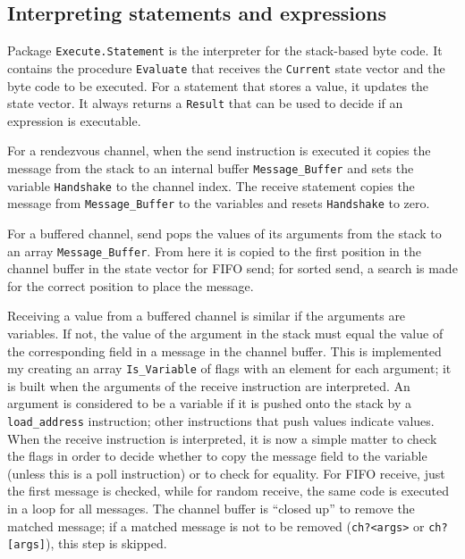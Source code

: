 \documentclass[11pt]{article}
\newcommand*{\p}[1]{\texttt{#1}}
\begin{document}
\subsection{Interpreting statements and expressions}
Package \p{Execute.Statement} is the interpreter for the stack-based
byte code. It contains the procedure \p{Evaluate} that receives the
\p{Current} state vector and the byte code to be executed. For a
statement that stores a value, it updates the state vector. It always
returns a \p{Result} that can be used to decide if an expression is
executable.

For a rendezvous channel, when the send instruction is executed it
copies the message from the stack to an internal buffer
\p{Message\_Buffer} and sets the variable \p{Handshake} to the channel
index. The receive statement copies the message from \p{Message\_Buffer}
to the variables and resets \p{Handshake} to zero.

For a buffered channel, send pops the values of its arguments from the
stack to an array \p{Message\_Buffer}. From here it is copied to the
first position in the channel buffer in the state vector for FIFO send;
for sorted send, a search is made for the correct position to place the
message.

Receiving a value from a buffered channel is similar if the arguments
are variables. If not, the value of the argument in the stack must equal
the value of the corresponding field in a message in the channel buffer.
This is implemented my creating an array \p{Is\_Variable} of flags with
an element for each argument; it is built when the arguments of the
receive instruction are interpreted. An argument is considered to be a
variable if it is pushed onto the stack by a \p{load\_address}
instruction; other instructions that push values indicate values. When
the receive instruction is interpreted, it is now a simple matter to
check the flags in order to decide whether to copy the message field to
the variable (unless this is a poll instruction) or to check for
equality. For FIFO receive, just the first message is checked, while for
random receive, the same code is executed in a loop for all messages.
The channel buffer is ``closed up'' to remove the matched message; if a
matched message is not to be removed (\p{ch?<args>} or \p{ch?[args]}),
this step is skipped.
\end{document}
